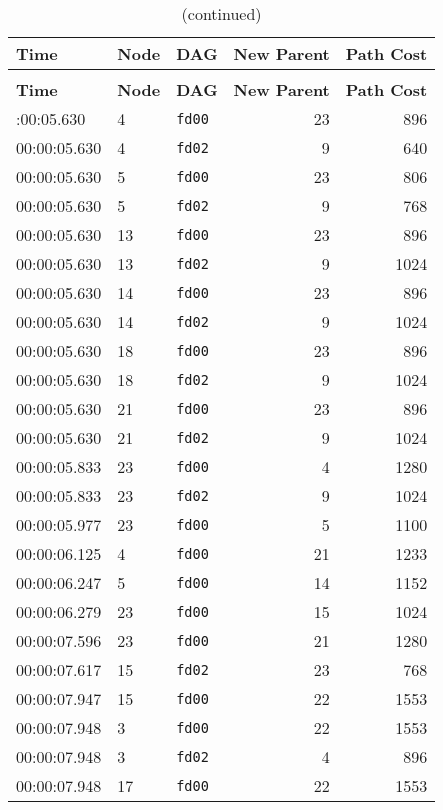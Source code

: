 \documentclass{article}
\begin{document}
\begin{longtable}{lllrr}
\caption{Log of Preferred Parent Changes} \\
\toprule
\textbf{Time} & \textbf{Node} & \textbf{DAG} & \textbf{New Parent} & \textbf{Path Cost} \\
\midrule
\endfirsthead
\caption*{(continued)} \\
\toprule
\textbf{Time} & \textbf{Node} & \textbf{DAG} & \textbf{New Parent} & \textbf{Path Cost} \\
\midrule
\endhead
\bottomrule
\endfoot
00:00:05.630 & 4 & \texttt{fd00} & 23 & 896 \\
00:00:05.630 & 4 & \texttt{fd02} & 9 & 640 \\
00:00:05.630 & 5 & \texttt{fd00} & 23 & 806 \\
00:00:05.630 & 5 & \texttt{fd02} & 9 & 768 \\
00:00:05.630 & 13 & \texttt{fd00} & 23 & 896 \\
00:00:05.630 & 13 & \texttt{fd02} & 9 & 1024 \\
00:00:05.630 & 14 & \texttt{fd00} & 23 & 896 \\
00:00:05.630 & 14 & \texttt{fd02} & 9 & 1024 \\
00:00:05.630 & 18 & \texttt{fd00} & 23 & 896 \\
00:00:05.630 & 18 & \texttt{fd02} & 9 & 1024 \\
00:00:05.630 & 21 & \texttt{fd00} & 23 & 896 \\
00:00:05.630 & 21 & \texttt{fd02} & 9 & 1024 \\
00:00:05.833 & 23 & \texttt{fd00} & 4 & 1280 \\
00:00:05.833 & 23 & \texttt{fd02} & 9 & 1024 \\
00:00:05.977 & 23 & \texttt{fd00} & 5 & 1100 \\
00:00:06.125 & 4 & \texttt{fd00} & 21 & 1233 \\
00:00:06.247 & 5 & \texttt{fd00} & 14 & 1152 \\
00:00:06.279 & 23 & \texttt{fd00} & 15 & 1024 \\
00:00:07.596 & 23 & \texttt{fd00} & 21 & 1280 \\
00:00:07.617 & 15 & \texttt{fd02} & 23 & 768 \\
00:00:07.947 & 15 & \texttt{fd00} & 22 & 1553 \\
00:00:07.948 & 3 & \texttt{fd00} & 22 & 1553 \\
00:00:07.948 & 3 & \texttt{fd02} & 4 & 896 \\
00:00:07.948 & 17 & \texttt{fd00} & 22 & 1553 \\

\end{longtable}
\end{document}
